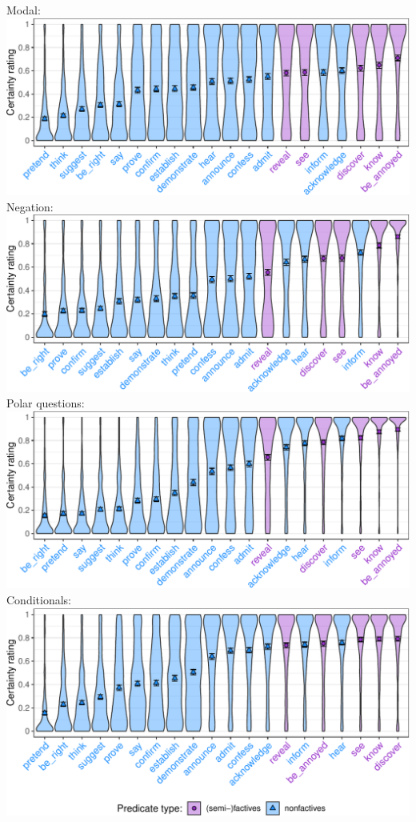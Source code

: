 \documentclass[a4paper,12pt,twoside]{article}
\begin{document}
		Modal:\newline
		\includegraphics[width = \linewidth]{modal-predicate-graph-1.pdf}
        Negation:\newline
        \includegraphics[width = \linewidth]{negation-predicate-graph-1.pdf}
        Polar questions:\newline
        \includegraphics[width = \linewidth]{question-predicate-graph-1.pdf}
        Conditionals:\newline
        \includegraphics[width = \linewidth]{conditional-predicate-graph-1.pdf}
\end{document}
